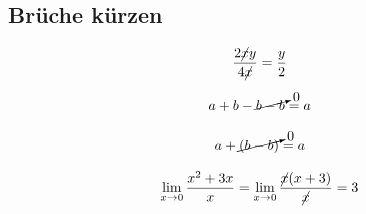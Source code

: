 \documentclass[11pt,a4paper]{scrartcl}
\begin{document}
	\subsection{Brüche kürzen}

	\begin{equation}
		\frac{2\cancel{x}y}{4\cancel{x}}
		= \frac{y}{2}
	\end{equation}

	\begin{equation}
		a+b-\cancelto{0}{b-b}=a
	\end{equation}
	
	\begin{equation}
		a+\cancelto{0}{(b-b)}=a
	\end{equation}

	\begin{equation}
		\lim_{x\to 0}
		\frac{x^2+3x}{x}
		=
		\lim_{x\to 0}
		\frac{\cancel{x}(x+3)}{\cancel{x}}
		=3
	\end{equation}
\end{document}
